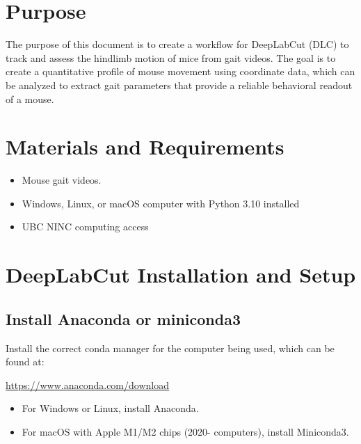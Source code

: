 \documentclass[11pt]{article}
\renewcommand{\[}{%
  \par\smallskip\noindent
  \begin{center}%
  \setlength{\fboxsep}{5pt}%
  \setlength{\fboxrule}{0.35pt}%
  \begin{lrbox}{\almaEquationBox}%
  $\displaystyle
}
\renewcommand{\]}{%
  $%
  \end{lrbox}%
  \fcolorbox{equationLine}{equationBack}{\usebox{\almaEquationBox}}%
  \end{center}%
  \smallskip\par
}
\begin{document}
\tableofcontents
\newpage
\section{Purpose}

The purpose of this document is to create a workflow for DeepLabCut (DLC) to track and assess the hindlimb motion of mice from gait videos. The goal is to create a quantitative profile of mouse movement using coordinate data, which can be analyzed to extract gait parameters that provide a reliable behavioral readout of a mouse.  

\section{Materials and Requirements}

\begin{itemize}
    \item Mouse gait videos.
    \item Windows, Linux, or macOS computer with Python 3.10 installed
    \item UBC NINC computing access
\end{itemize}

\section{DeepLabCut Installation and Setup}


\subsection{Install Anaconda or miniconda3}

Install the correct conda manager for the computer being used, which can be found at: 

\begin{tcolorbox}
\url{https://www.anaconda.com/download}
\end{tcolorbox}

\begin{itemize}
    \item For Windows or Linux, install Anaconda.
    \item For macOS with Apple M1/M2 chips (2020- computers), install Miniconda3.
\end{itemize}
\end{document}
